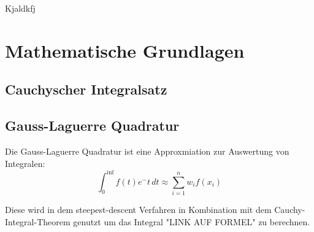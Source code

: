 Kjaldkfj



\section{Mathematische Grundlagen}


\subsection{Cauchyscher Integralsatz}




\subsection{Gauss-Laguerre Quadratur}

Die Gauss-Laguerre Quadratur ist eine Approxmiation zur Auswertung von Integralen:
\begin{equation}
    \int_{0}^{\inf } f(t) e^-t  \,dt  \approx \sum_{i = 1}^{n} w_if(x_i) 
\end{equation}

Diese wird in dem steepest-descent Verfahren in Kombination mit dem Cauchy-Integral-Theorem genutzt um das Integral "LINK AUF FORMEL" zu berechnen.

